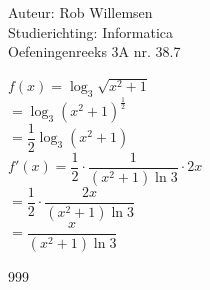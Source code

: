 \documentclass[a4paper]{article}
\begin{document}
\noindent \large Auteur: Rob Willemsen \\
\noindent \large Studierichting: Informatica \\
\noindent \large Oefeningenreeks 3A nr. 38.7 \\

\medskip

\normalsize

$f(x) = \log_3\sqrt{x^2 + 1}$ \\

$= \log_3(x^2 + 1)^{\tfrac{1}{2}}$ \\

$= \dfrac{1}{2} \log_3(x^2 + 1)$ \\

$f'(x) = \dfrac{1}{2} \cdot \dfrac{1}{(x^2 + 1)\ln 3} \cdot 2x$ \\

$= \dfrac{1}{2} \cdot \dfrac{2x}{(x^2 + 1)\ln 3}$ \\

$= \dfrac{x}{(x^2 + 1)\ln 3}$ \\

\begin{thebibliography}{999}
\end{thebibliography}
\end{document}
